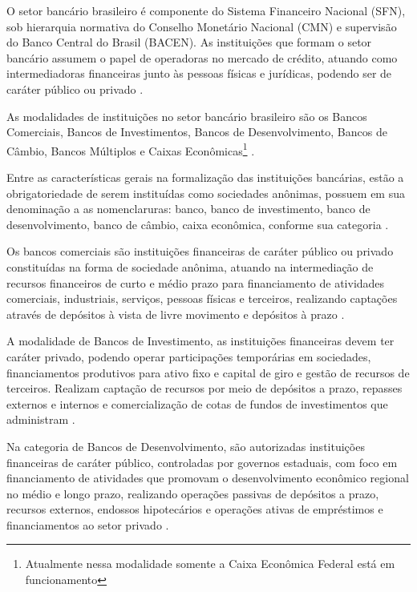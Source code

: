 \documentclass[12pt,12pt,openright,oneside,a4paper,chapter=TITLE,section=TITLE,subsection=TITLE,subsubsection=TITLE english,french,spanish,portugues,sumario=tradicional]{abntex2}
\begin{document}
O setor bancário brasileiro é componente do Sistema Financeiro Nacional (SFN),
sob hierarquia normativa do Conselho Monetário Nacional (CMN) e supervisão do
Banco Central do Brasil (BACEN). As instituições que formam o setor bancário
assumem o papel de operadoras no mercado de crédito, atuando como
intermediadoras financeiras junto às pessoas físicas e jurídicas, podendo ser
de caráter público ou privado \cite{Lei:4595:1964}.

As modalidades de instituições no setor bancário brasileiro são os Bancos
Comerciais, Bancos de Investimentos, Bancos de Desenvolvimento, Bancos de
Câmbio, Bancos Múltiplos e Caixas Econômicas\footnote{Atualmente nessa
modalidade somente a Caixa Econômica Federal está em funcionamento}
\cite{Lei:4595:1964} \cite{Lei:4595:1964} \cite{Res:2099:1994} \cite{Res:2624:1999} \cite{Res:394:1976} \cite{Res:3426:2006} \cite{DL:759:1969}.

Entre as características gerais na formalização das instituições bancárias, estão a obrigatoriedade de serem instituídas como sociedades anônimas, possuem em sua denominação a as nomenclaruras: banco, banco de investimento, banco de desenvolvimento, banco de câmbio, caixa econômica, conforme sua categoria \cite{Lei:4595:1964} \cite{Res:2099:1994} \cite{Res:2624:1999} \cite{Res:394:1976} \cite{Res:3426:2006} \cite{DL:759:1969}.

Os bancos comerciais são instituições financeiras de caráter público ou privado
constituídas na forma de sociedade anônima, atuando na intermediação de
recursos financeiros de curto e médio prazo para financiamento de atividades
comerciais, industriais, serviços, pessoas físicas e terceiros, realizando
captações através de depósitos à vista de livre movimento e depósitos à prazo
\cite{Res:2099:1994}.

A modalidade de Bancos de Investimento, as instituições financeiras devem ter
caráter privado, podendo operar participações temporárias em sociedades,
financiamentos produtivos para ativo fixo e capital de giro e gestão de
recursos de terceiros. Realizam captação de recursos por meio de depósitos a
prazo, repasses externos e internos e comercialização de cotas de fundos de
investimentos que administram \cite{Res:2624:1999}.

Na categoria de Bancos de Desenvolvimento, são autorizadas instituições
financeiras de caráter público, controladas por governos estaduais, com foco em
financiamento de atividades que promovam o desenvolvimento econômico regional
no médio e longo prazo, realizando operações passivas de depósitos a prazo,
recursos externos, endossos hipotecários e operações ativas de empréstimos e
financiamentos ao setor privado \cite{Res:394:1976}.
\end{document}
